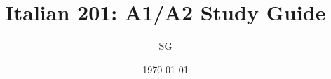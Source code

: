     \title{Italian 201: A1/A2 Study Guide}
    \author{SG}
    \date{\today}
    \maketitle
    \tableofcontents
    
